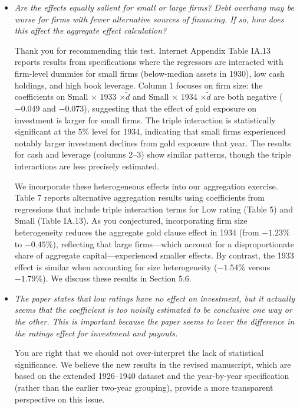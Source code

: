 \begin{itemize}
    \item[\textit{\textcolor{red!60!black}{g.}}] \textit{\textcolor{red!60!black}{
    Are the effects equally salient for small or large firms? Debt overhang may be worse for firms with fewer alternative sources of financing. If so, how does this affect the aggregate effect calculation?
    }}

    \bigskip

    \noindent Thank you for recommending this test. Internet Appendix Table IA.13 reports results from specifications where the regressors are interacted with firm-level dummies for small firms (below-median assets in 1930), low cash holdings, and high book leverage. Column 1 focuses on firm size: the coefficients on Small $\times$ 1933 $\times \tilde{d}$ and Small $\times$ 1934 $\times \tilde{d}$ are both negative ($-0.049$ and $-0.073$), suggesting that the effect of gold exposure on investment is larger for small firms. The triple interaction is statistically significant at the 5\% level for 1934, indicating that small firms experienced notably larger investment declines from gold exposure that year. The results for cash and leverage (columns 2--3) show similar patterns, though the triple interactions are less precisely estimated.
    
   We incorporate these heterogeneous effects into our aggregation exercise. Table 7 reports alternative aggregation results using coefficients from regressions that include triple interaction terms for Low rating (Table 5) and Small (Table IA.13). As you conjectured, incorporating firm size heterogeneity reduces the aggregate gold clause effect in 1934 (from $-1.23\%$ to $-0.45\%$), reflecting that large firms---which account for a disproportionate share of aggregate capital---experienced smaller effects. By contrast, the 1933 effect is similar when accounting for size heterogeneity ($-1.54\%$ versus $-1.79\%$). We discuss these results in Section 5.6. 

    \item[\textit{\textcolor{red!60!black}{h.}}] \textit{\textcolor{red!60!black}{
    The paper states that low ratings have no effect on investment, but it actually seems that the coefficient is too noisily estimated to be conclusive one way or the other. This is important because the paper seems to lever the difference in the ratings effect for investment and payouts.
    }}

    \bigskip

    \noindent You are right that we should not over-interpret the lack of statistical significance. We believe the new results in the revised manuscript, which are based on the extended 1926--1940 dataset and the year-by-year specification (rather than the earlier two-year grouping), provide a more transparent perspective on this issue.
    

\end{itemize}
